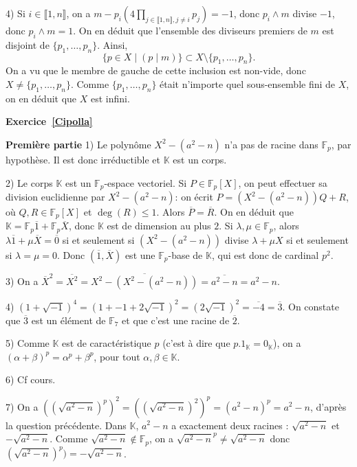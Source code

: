 \documentclass[11pt,a4paper]{article}
\newcommand{\F}{\mathbb{F}}
\newcommand{\KK}{\mathbb{K}}
\begin{document}
4) Si $i\in \llbracket 1,n\rrbracket$, on a $m- p_i (4\prod_{j\in \llbracket 1,n\rrbracket, j\neq i} p_j)=-1$, donc $p_i\wedge m$ divise $-1$, donc $p_i\wedge m=1$. On en déduit que l'ensemble des diviseurs premiers de $m$ est disjoint de $\{p_1,\ldots,p_n\}$. Ainsi, \[\{p\in X\mid (p\mid m)\}\subset X\setminus \{p_1,\ldots,p_n\}.\] On a vu que le membre de gauche de cette inclusion est non-vide, donc $X\neq \{p_1,\ldots,p_n\}$. Comme $\{p_1,\ldots,p_n\}$ était n'importe quel sous-ensemble fini de $X$, on en déduit que $X$ est infini.  












\textbf{Exercice~\ref{Cipolla}}

\textbf{Première partie}
1) Le polynôme $X^2-(a^2-n)$ n'a pas de racine dans $\F_p$, par hypothèse. Il est donc irréductible et $\mathbb{K}$ est un corps.

2) Le corps $\mathbb{K}$ est un $\F_p$-espace vectoriel. Si $P\in \F_p[X]$, on peut effectuer sa division euclidienne par $X^2-(a^2-n)$: on  écrit $P=(X^2-(a^2-n)) Q+R$, où $Q,R\in \F_p[X]$ et $\deg(R)\leq 1$. Alors $\overline{P}=\overline{R}$. On en déduit que $\mathbb{K}=\F_p \overline{1}+\F_p \overline{X}$, donc $\mathbb{K}$ est de dimension au plus $2$. Si $\lambda,\mu\in \F_p$, alors $\lambda \overline{1}+\mu \overline{X}=\overline{0}$ si et seulement si $(X^2-(a^2-n))$ divise $\lambda+\mu X$ si et seulement si $\lambda=\mu=0$. Donc $(\overline{1},\overline{X})$ est une $\F_p$-base de 
$\mathbb{K}$, qui est donc de cardinal $p^2$. 

3) On a $\overline{X}^2=\overline{X^2}=\overline{X^2-(X^2-(a^2-n))}=\overline{a^2-n}=a^2-n$.

4) $(1+\sqrt{-1})^4=(1+-1+2\sqrt{-1})^2=(2\sqrt{-1})^2=\overline{-4}=\overline{3}$. On constate que $\overline{3}$ est un élément de  $\F_7$ et que c'est une racine de $\overline{2}$.

5) Comme $\KK$  est de caractéristique $p$ (c'est à dire que $p.1_\KK=0_\KK$), on a $(\alpha+\beta)^p=\alpha^p+\beta^p$, pour tout $\alpha,\beta\in \KK$. 

6) Cf cours.

7) On a $((\sqrt{a^2-n})^p)^2=((\sqrt{a^2-n})^2)^p=(a^2-n)^p=a^2-n$, d'après la question précédente. Dans $\KK$, $a^2-n$ a exactement deux racines : $\sqrt{a^2-n}$ et $-\sqrt{a^2-n}$. Comme $\sqrt{a^2-n}\notin \F_p$, on  a $\sqrt{a^2-n}^p\neq \sqrt{a^2-n}$ donc $(\sqrt{a^2-n})^p)=-\sqrt{a^2-n}$. 
\end{document}
